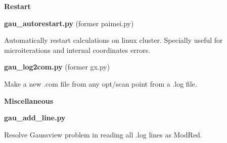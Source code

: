 \documentclass[11pt,a4paper]{article}
\begin{document}
\textbf{Restart}

\noindent
\hrulefill

\vspace{3mm}

\textbf{gau\_autorestart.py} (former paimei.py)

\noindent
Automatically restart calculations on linux cluster. Specially useful for
microiterations and internal coordinates errors.

\vspace{3mm}

\textbf{gau\_log2com.py} (former gx.py)

\noindent
Make a new .com file from any opt/scan point from a .log file.

\vspace{9mm}

\textbf{Miscellaneous}

\noindent
\hrulefill

\vspace{3mm}

\textbf{gau\_add\_line.py} 

\noindent
Resolve Gaussview problem in reading all .log lines as ModRed.
\end{document}
